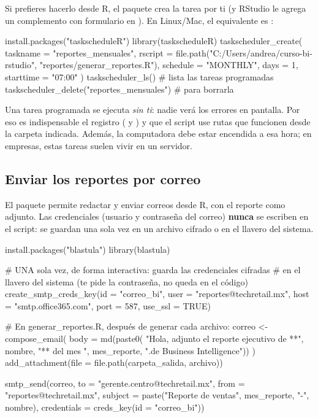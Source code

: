 Si prefieres hacerlo desde R, el paquete  crea la
tarea por ti (y RStudio le agrega un complemento con formulario en
). En Linux/Mac, el equivalente es :

\begin{rnoejecutar}
install.packages("taskscheduleR")
library(taskscheduleR)
taskscheduler_create(
  taskname  = "reportes_mensuales",
  rscript   = file.path("C:/Users/andrea/curso-bi-rstudio",
                        "reportes/generar_reportes.R"),
  schedule  = "MONTHLY",
  days      = 1,
  starttime = "07:00"
)
taskscheduler_ls()                        # lista las tareas programadas
taskscheduler_delete("reportes_mensuales")  # para borrarla
\end{rnoejecutar}

\begin{advertencia}
Una tarea programada se ejecuta \emph{sin ti}: nadie verá los errores en
pantalla. Por eso es indispensable el registro (
y ) y que el script use rutas que funcionen desde la
carpeta indicada. Además, la computadora debe estar encendida a esa hora; en
empresas, estas tareas suelen vivir en un servidor.
\end{advertencia}

\subsection{Enviar los reportes por correo}

El paquete  permite redactar y enviar correos desde R, con
el reporte como adjunto. Las credenciales (usuario y contraseña del correo)
\textbf{nunca} se escriben en el script: se guardan una sola vez en un
archivo cifrado o en el llavero del sistema.

\begin{rnoejecutar}
install.packages("blastula")
library(blastula)

# UNA sola vez, de forma interactiva: guarda las credenciales cifradas
# en el llavero del sistema (te pide la contraseña, no queda en el código)
create_smtp_creds_key(id = "correo_bi", user = "reportes@techretail.mx",
                      host = "smtp.office365.com", port = 587,
                      use_ssl = TRUE)

# En generar_reportes.R, después de generar cada archivo:
correo <- compose_email(
  body = md(paste0(
    "Hola, adjunto el reporte ejecutivo de **", nombre, "** del mes ",
    mes_reporte, ".\n{} de Business Intelligence"))
) %
  add_attachment(file = file.path(carpeta_salida, archivo))

smtp_send(correo,
          to = "gerente.centro@techretail.mx",
          from = "reportes@techretail.mx",
          subject = paste("Reporte de ventas", mes_reporte, "-", nombre),
          credentials = creds_key(id = "correo_bi"))
\end{rnoejecutar}

